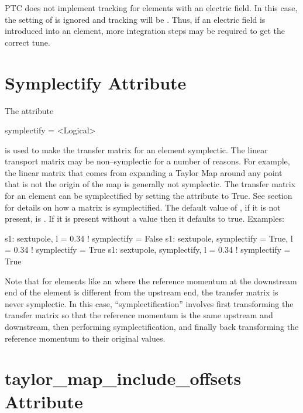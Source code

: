 PTC does not implement  tracking for elements with an electric field. In
this case, the setting of  is ignored and tracking will be
. Thus, if an electric field is introduced into an element, more
integration steps may be required to get the correct tune.


\section{Symplectify Attribute}
\label{s:symp}

The  attribute
\begin{example}
  symplectify = <Logical>
\end{example}
is used to make the transfer matrix for an element symplectic. The
linear transport matrix may be non--symplectic for a number of
reasons.  For example, the linear matrix that comes from expanding a
Taylor Map around any point that is not the origin of the map is
generally not symplectic. The transfer matrix for an element can be
symplectified by setting the  attribute to True. See
section~ for details on how a matrix is
symplectified. The default value of , if it is not
present, is . If it is present without a value then it
defaults to true. Examples:
\begin{example}
  s1: sextupole, l = 0.34                       ! symplectify = False
  s1: sextupole, symplectify = True, l = 0.34   ! symplectify = True
  s1: sextupole, symplectify, l = 0.34          ! symplectify = True
\end{example}

\label{lcavity} Note that for elements like an  where the
reference momentum at the downstream end of the element is different
from the upstream end, the transfer matrix is never symplectic. In
this case, ``symplectification'' involves first transforming the
transfer matrix so that the reference momentum is the same upstream
and downstream, then performing symplectification, and finally back
transforming the reference momentum to their original values.

\section{taylor_map_include_offsets Attribute}
\label{s:mapoff}

